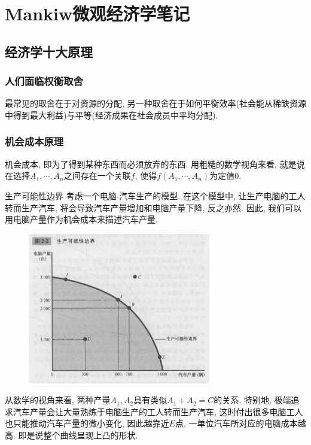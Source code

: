 \chapter{Mankiw微观经济学笔记}

\section{经济学十大原理}

\subsection*{人们面临权衡取舍}

最常见的取舍在于对资源的分配, 另一种取舍在于如何平衡效率(社会能从稀缺资源中得到最大利益)与平等(经济成果在社会成员中平均分配). 

\subsection*{机会成本原理}

机会成本, 即为了得到某种东西而必须放弃的东西. 用粗糙的数学视角来看, 就是说在选择$A_1,\cdots ,A_n$之间存在一个关联$f$, 使得$f(A_1,\cdots ,A_n)$为定值$0$. 

\begin{example}{生产可能性边界}
	考虑一个电脑-汽车生产的模型. 在这个模型中, 让生产电脑的工人转而生产汽车, 将会导致汽车产量增加和电脑产量下降, 反之亦然. 因此, 我们可以用电脑产量作为机会成本来描述汽车产量. 
	\begin{figure}[H]
		\centering
		\includegraphics[width=8cm]{attachment/Fig2_2.png}
	\end{figure}
	从数学的视角来看, 两种产量$A_1,A_2$具有类似$A_1+A_2=C$的关系. 特别地, 极端追求汽车产量会让大量熟练于电脑生产的工人转而生产汽车, 这时付出很多电脑工人也只能推动汽车产量的微小变化, 因此越靠近$E$点, 一单位汽车所对应的电脑成本越高. 即是说整个曲线呈现上凸的形状. 
\end{example}

